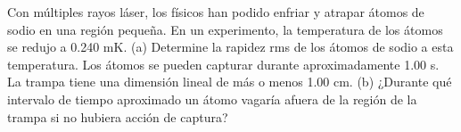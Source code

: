 \item Con múltiples rayos láser, los físicos han podido enfriar y atrapar átomos de sodio en una región pequeña. En un experimento, la temperatura de los átomos se redujo a 0.240 mK. (a) Determine la rapidez rms de los átomos de sodio a esta temperatura. Los átomos se pueden capturar durante aproximadamente 1.00 s. La trampa tiene una dimensión lineal de más o menos 1.00 cm. (b) ¿Durante qué intervalo de tiempo aproximado un átomo vagaría afuera de la región de la trampa si no hubiera acción de captura?
